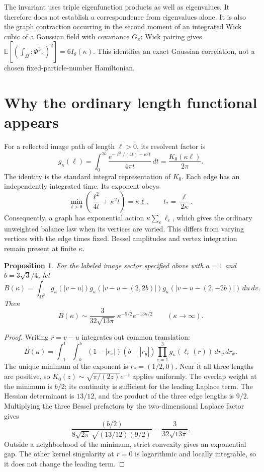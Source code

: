 \documentclass[11pt]{article}
\newtheorem{proposition}{Proposition}
\begin{document}
The invariant uses triple eigenfunction products as well as
eigenvalues. It therefore does not establish a correspondence from
eigenvalues alone. It is also the graph contraction occurring in the
second moment of an integrated Wick cubic of a Gaussian field with
covariance $G_\kappa$: Wick pairing gives
$\mathbb E[(\int_\Omega:\!\Phi^3\!:)^2]=6I_\theta(\kappa)$.
This identifies an exact Gaussian correlation, not a chosen
fixed-particle-number Hamiltonian.

\section{Why the ordinary length functional appears}
For a reflected image path of length $\ell>0$, its resolvent factor is
\[
 g_\kappa(\ell)
 =\int_0^\infty
 \frac{e^{-\ell^2/(4t)-\kappa^2t}}{4\pi t}\,dt
 =\frac{K_0(\kappa\ell)}{2\pi}.
\]
The identity is the standard integral representation of $K_0$.
Each edge has an independently integrated time. Its exponent obeys
\[
 \min_{t>0}\left(\frac{\ell^2}{4t}+\kappa^2t\right)
 =\kappa\ell,\qquad t_*=\frac{\ell}{2\kappa}.
\]
Consequently, a graph has exponential action
$\kappa\sum_e\ell_e$, which gives the ordinary unweighted balance
law when its vertices are varied. This differs from varying vertices
with the edge times fixed. Bessel amplitudes and vertex integration
remain present at finite $\kappa$.

\begin{proposition}
For the labeled image sector specified above with
$a=1$ and $b=3\sqrt3/4$, let
\[
 B(\kappa)=\int_{\Omega^2}
 g_\kappa(|v-u|)
 g_\kappa(|v-u-(2,2b)|)
 g_\kappa(|v-u-(2,-2b)|)\,du\,dv.
\]
Then
\[
 B(\kappa)\sim
 \frac{3}{32\sqrt{13\pi}}\,
 \kappa^{-5/2}e^{-13\kappa/2}
 \qquad(\kappa\longrightarrow\infty).
\]
\end{proposition}
\begin{proof}
Writing $r=v-u$ integrates out common translation:
\[
 B(\kappa)=\int_{-1}^1\int_{-b}^b
 (1-|r_x|)(b-|r_y|)
 \prod_{e=1}^3g_\kappa(\ell_e(r))\,dr_y\,dr_x.
\]
The unique minimum of the exponent is $r_*=(1/2,0)$.
Near it all three lengths are positive, so
$K_0(z)\sim\sqrt{\pi/(2z)}e^{-z}$ applies uniformly.
The overlap weight at the minimum is $b/2$; its continuity is
sufficient for the leading Laplace term. The Hessian determinant is
$13/12$, and the product of the three edge lengths is $9/2$.
Multiplying the three Bessel prefactors by the two-dimensional
Laplace factor gives
\[
 \frac{(b/2)}{8\sqrt{2\pi}\,
       \sqrt{(13/12)(9/2)}}=\frac{3}{32\sqrt{13\pi}}.
\]
Outside a neighborhood of the minimum, strict convexity gives an
exponential gap. The other kernel singularity at $r=0$ is logarithmic
and locally integrable, so it does not change the leading term.
\end{proof}
\end{document}

